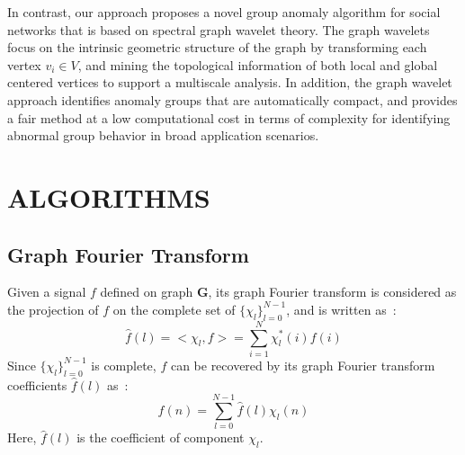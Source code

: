 In contrast, our approach proposes a novel group anomaly algorithm for social networks that is based on spectral graph wavelet theory.
The graph wavelets focus on the intrinsic geometric structure of the graph by transforming each vertex $v_i\in V$, and mining the topological information of both local and global centered vertices to support a multiscale analysis. In addition, the graph wavelet approach identifies anomaly groups that are automatically compact, and provides a fair method at a low computational cost in terms of complexity for identifying abnormal group behavior in broad application scenarios.


\section{ALGORITHMS} \label{sec:algorithm}


\subsection{Graph Fourier Transform}
\label{sec:Graph_Fourier_Transform}
Given a signal $f$ defined on graph $\mathbf{G}$, its graph Fourier transform is considered as the projection of $f$ on the complete set of $\{\chi_l\}_{l=0}^{N-1}$, and is written as~\cite{hammond2011wavelets}:
\begin{equation}
\label{eq:Graph_Fourier_Transform1}
\hat{f}(l)=<\chi_{l},f>=\sum_{i=1}^{N}\chi^*_{l}(i)f(i)
\end{equation}
Since $\{\chi_l\}_{l=0}^{N-1}$ is complete, $f$ can be recovered by its graph Fourier transform coefficients $\hat{f}(l)$ as~\cite{hammond2011wavelets}:
\begin{equation}
\label{eq:Inverser_Graph_Fourier_Transform}
f(n)=\sum_{l=0}^{N-1}\hat{f}(l)\chi_{l}(n)
\end{equation}
Here, $\hat{f}(l)$ is the coefficient of component $\chi_l$.
